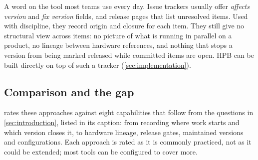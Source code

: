 A word on the tool most teams use every day. Issue trackers usually offer
\emph{affects version} and \emph{fix version} fields, and release pages
that list unresolved items. Used with discipline, they record origin and
closure for each item. They still give no structural view across items: no
picture of what is running in parallel on a product, no lineage between
hardware references, and nothing that stops a version from being marked
released while committed items are open. HPB can be built directly on top
of such a tracker (\cref{sec:implementation}).

\subsection{Comparison and the gap}
\label{sec:gaps-comparison}

 rates these approaches against eight capabilities
that follow from the questions in \cref{sec:introduction}, listed in its
caption: from recording where work starts and which version closes it, to
hardware lineage, release gates, maintained versions and configurations.
Each approach is rated as it is commonly practiced, not as it could be
extended; most tools can be configured to cover more.

